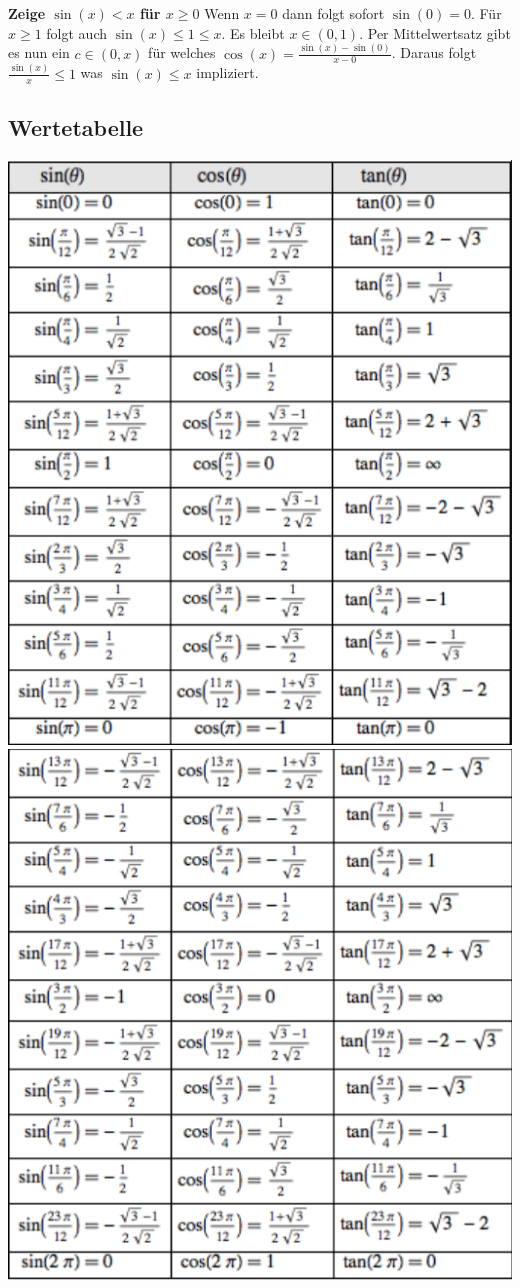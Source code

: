 \documentclass[25pt]{sciposter}
\begin{document}
\begin{multicols}{3}
\textbf{Zeige $\sin(x) < x$ für $x \geq 0$}
Wenn $x = 0$ dann folgt sofort $\sin(0) = 0$. Für $x\geq 1$ folgt auch $\sin(x) \leq 1 \leq x$. Es bleibt $x \in (0,1)$. Per Mittelwertsatz gibt es nun ein $c \in (0,x)$ für welches $\cos(x) = \frac{\sin(x) - \sin(0)}{x - 0}$. Daraus folgt $\frac{\sin(x)}{x} \leq 1$ was $\sin(x) \leq x$ impliziert.



\subsection*{Wertetabelle}
\includegraphics[width=0.7\linewidth]{p1Trig.png}\\
\includegraphics[width=0.7\linewidth]{p2Trig.png}




\end{multicols}
\end{document}
